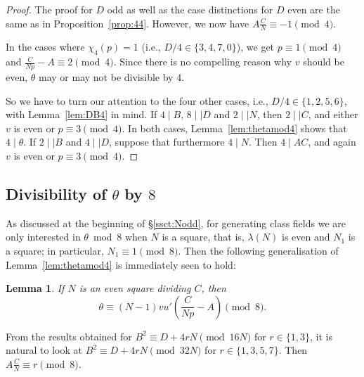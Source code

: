 \documentclass[12pt,twoside,leqno]{article}
\newtheorem{lemma}[theorem]{Lemma}
\numberwithin{equation}{section}
\begin{document}
\begin{proof}
The proof for $D$ odd as well as the case distinctions for $D$ even are
the same as in Proposition~\ref {prop:44}. However, we now have
$A \frac {C}{N} \equiv -1 \pmod 4$.

In the cases where $\chi_4(p) = 1$ (i.e., $D/4 \in \{3, 4, 7, 0\}$),
we get $p \equiv 1 \pmod 4$ and $\frac {C}{N p} - A \equiv 2
\pmod 4$. Since there is no compelling reason why $v$ should be even,
$\theta$ may or may not be divisible by $4$.

So we have to turn our attention to the four other cases, i.e., $D/4
\in \{1, 2, 5, 6\}$, with Lemma~\ref{lem:DB4} in mind.
If $4 \mid B$, $8 \mid\mid D$ and $2 \mid\mid N$, then $2 \mid\mid C$,
and either $v$ is even or $p \equiv 3 \pmod 4$. In both cases,
Lemma~\ref {lem:thetamod4} shows that $4 \mid \theta$.
If $2 \mid\mid B$ and $4 \mid\mid D$, suppose that furthermore $4 \mid N$.
Then $4 \mid A C$, and again $v$ is even or $p \equiv 3 \pmod 4$.
\end {proof}


\subsection* {Divisibility of \texorpdfstring {$\theta$}{theta} by $8$}

As discussed at the beginning of \S\ref {ssct:Nodd}, for
generating class fields we are only interested in $\theta \bmod 8$
when $N$ is a square, that is, $\lambda (N)$ is even and $N_1$ is
a square; in particular, $N_1 \equiv 1 \pmod 8$. Then the
following generalisation of Lemma~\ref {lem:thetamod4} is
immediately seen to hold:

\begin {lemma}
\label {lem:thetamod8}
If $N$ is an even square dividing $C$, then
\[
\theta \equiv (N-1) v u' \left(\frac{C}{Np} -A \right) \pmod 8.
\]
\end {lemma}

From the results obtained for $B^2 \equiv D + 4 r N \pmod {16 N}$ for
$r \in \{1, 3\}$, it is natural to look at $B^2\equiv D+ 4 r N\pmod {32N}$
for $r\in \{1, 3, 5, 7\}$. Then $A \frac{C}{N} \equiv r \pmod 8$.
\end{document}
